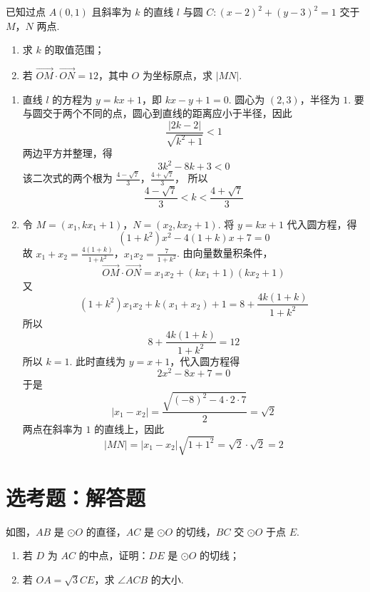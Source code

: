 \begin{problem}
已知过点 \(A(0,1)\) 且斜率为 \(k\) 的直线 \(l\) 与圆 \(C: (x - 2)^2 + (y - 3)^2 = 1\) 交于 \(M\)，\(N\) 两点.

\begin{enumerate}
\item 求 \(k\) 的取值范围；
\item 若 \(\overrightarrow{OM}\cdot\overrightarrow{ON}=12\)，其中 \(O\) 为坐标原点，求 \(|MN|\).
\end{enumerate}
\end{problem}

\begin{solution}
\begin{enumerate}
\item 直线 \(l\) 的方程为 \(y=kx+1\)，即 \(kx-y+1=0\). 圆心为 \((2,3)\)，半径为 \(1\). 要与圆交于两个不同的点，圆心到直线的距离应小于半径，因此
\[
\frac{|2k-2|}{\sqrt{k^2+1}}<1
\]
两边平方并整理，得
\[
3k^2-8k+3<0
\]
该二次式的两个根为
\(\frac{4-\sqrt7}{3}\)，\(\frac{4+\sqrt7}{3}\)，
所以
\[
\frac{4-\sqrt7}{3}<k<\frac{4+\sqrt7}{3}
\]

\item 令 \(M=(x_1,kx_1+1)\)，\(N=(x_2,kx_2+1)\). 将 \(y=kx+1\) 代入圆方程，得
\[
(1+k^2)x^2-4(1+k)x+7=0
\]
故
\(x_1+x_2=\frac{4(1+k)}{1+k^2}\)，\(x_1x_2=\frac{7}{1+k^2}\).
由向量数量积条件，
\[
\overrightarrow{OM}\cdot\overrightarrow{ON}
=x_1x_2+(kx_1+1)(kx_2+1)
\]
又
\[
(1+k^2)x_1x_2+k(x_1+x_2)+1
=8+\frac{4k(1+k)}{1+k^2}
\]
所以
\[
8+\frac{4k(1+k)}{1+k^2}=12
\]
所以 \(k=1\). 此时直线为 \(y=x+1\)，代入圆方程得
\[
2x^2-8x+7=0
\]
于是
\[
|x_1-x_2|=\frac{\sqrt{(-8)^2-4\cdot2\cdot7}}{2}=\sqrt2
\]
两点在斜率为 \(1\) 的直线上，因此
\[
|MN|=|x_1-x_2|\sqrt{1+1^2}=\sqrt2\cdot\sqrt2=2
\]
\end{enumerate}
\end{solution}

\section{选考题：解答题}

\begin{problem}
如图，\(AB\) 是 \(\odot O\) 的直径，\(AC\) 是 \(\odot O\) 的切线，\(BC\) 交 \(\odot O\) 于点 \(E\).

\begin{enumerate}
\item 若 \(D\) 为 \(AC\) 的中点，证明：\(DE\) 是 \(\odot O\) 的切线；
\item 若 \(OA = \sqrt{3} CE\)，求 \(\angle ACB\) 的大小.
\end{enumerate}

\end{problem}

